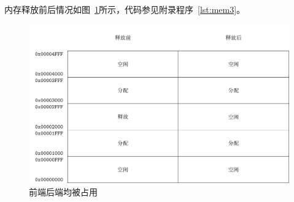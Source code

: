 内存释放前后情况如图~\ref{fig:mem3}所示，代码参见附录程序~\ref{lst:mem3}。
\begin{figure}[H]
  \centering
  \includegraphics[width=.7\textwidth]{../Fig/mem3.pdf}
  \caption{前端后端均被占用}
  \label{fig:mem3}
\end{figure}

